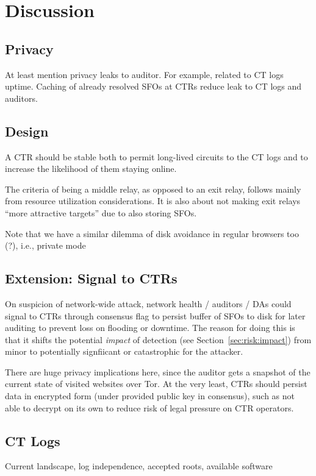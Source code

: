 \section{Discussion} \label{sec:discussion}

\subsection{Privacy}
At least mention privacy leaks to auditor. For example, related to CT logs
uptime. Caching of already resolved SFOs at CTRs reduce leak to CT logs and
auditors.

\subsection{Design}
A CTR should be stable both to permit long-lived circuits to the CT logs and
to increase the likelihood of them staying online.

The criteria of being a middle relay, as opposed to an exit relay, follows
mainly from resource utilization considerations.  It is also about not making
exit relays ``more attractive targets'' due to also storing SFOs.

Note that we have a similar dilemma of disk avoidance in regular browsers too
(?), i.e., private mode

\subsection{Extension: Signal to CTRs}
On suspicion of network-wide attack, network health / auditors / DAs could
signal to CTRs through consensus flag to persist buffer of SFOs to disk for
later auditing to prevent loss on flooding or downtime. The reason for doing
this is that it shifts the potential \emph{impact} of detection (see
Section~\ref{sec:risk:impact}) from minor to potentially signfiicant or
catastrophic for the attacker.

There are huge privacy implications here, since the auditor gets a snapshot of
the current state of visited websites over Tor. At the very least, CTRs should
persist data in encrypted form (under provided public key in consensus), such as
not able to decrypt on its own to reduce risk of legal pressure on CTR
operators.

\subsection{CT Logs} \label{sec:discussion:logs}
Current landscape, log independence, accepted roots, available software

